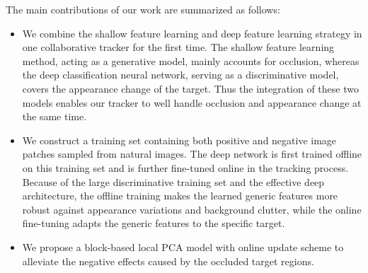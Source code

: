 \documentclass[preprint,12pt,review]{elsarticle}
\begin{document}


The main contributions of our work are summarized as follows:
\begin{itemize}

\item { We combine the shallow feature learning and deep feature learning strategy in one collaborative tracker for the first time.
%
The shallow feature learning method, acting as a generative model, mainly accounts for occlusion, whereas the deep classification neural network, serving as a discriminative model, covers the appearance change of the target.
%
Thus the integration of these two models enables our tracker to well handle occlusion and appearance change at the same time.
}
%

\item{We construct a training set containing both positive and negative image patches sampled from natural images.
    The deep network is first trained offline on this training set and is further fine-tuned online in the tracking process.
    Because of the large discriminative training set and the effective deep architecture, the offline training makes the learned generic features more robust against appearance variations and background clutter, while the online fine-tuning adapts the generic features to the specific target.
} 
%
\item{We propose a block-based local PCA model with online update scheme to alleviate the negative effects caused by the occluded target regions.} 
%
\end{itemize}
\end{document}
